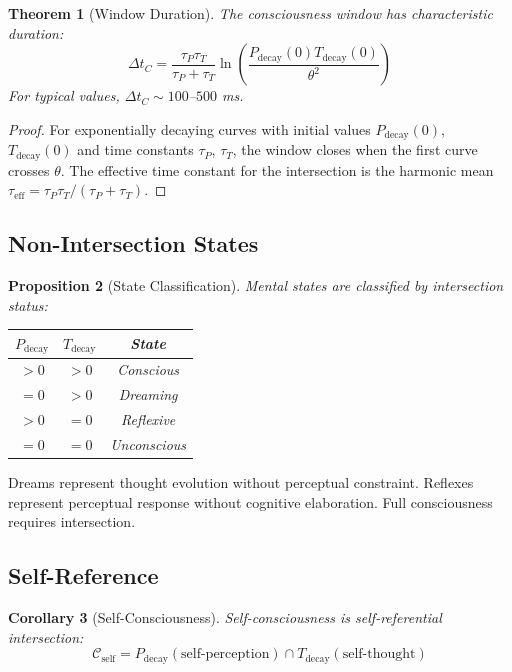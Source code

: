 \documentclass[twocolumn,amsmath,amssymb,aps,prl,superscriptaddress]{revtex4-2}
\newtheorem{theorem}{Theorem}[section]
\newtheorem{proposition}[theorem]{Proposition}
\newtheorem{corollary}[theorem]{Corollary}
\newcommand{\Ccat}{\mathcal{C}}
\newcommand{\Pdecay}{P_{\text{decay}}}
\newcommand{\Tdecay}{T_{\text{decay}}}
\begin{document}
\begin{theorem}[Window Duration]
\label{thm:window}
The consciousness window has characteristic duration:
\begin{equation}
\Delta t_C = \frac{\tau_P \tau_T}{\tau_P + \tau_T} \ln\left(\frac{\Pdecay(0) \Tdecay(0)}{\theta^2}\right)
\end{equation}
For typical values, $\Delta t_C \sim 100$--$500$ ms.
\end{theorem}

\begin{proof}
For exponentially decaying curves with initial values $\Pdecay(0)$, $\Tdecay(0)$ and time constants $\tau_P$, $\tau_T$, the window closes when the first curve crosses $\theta$. The effective time constant for the intersection is the harmonic mean $\tau_{\text{eff}} = \tau_P \tau_T / (\tau_P + \tau_T)$.
\end{proof}

\subsection{Non-Intersection States}

\begin{proposition}[State Classification]
Mental states are classified by intersection status:
\begin{center}
\begin{tabular}{ccc}
\toprule
$\Pdecay$ & $\Tdecay$ & State \\
\midrule
$> 0$ & $> 0$ & Conscious \\
$= 0$ & $> 0$ & Dreaming \\
$> 0$ & $= 0$ & Reflexive \\
$= 0$ & $= 0$ & Unconscious \\
\bottomrule
\end{tabular}
\end{center}
\end{proposition}

Dreams represent thought evolution without perceptual constraint. Reflexes represent perceptual response without cognitive elaboration. Full consciousness requires intersection.

\subsection{Self-Reference}

\begin{corollary}[Self-Consciousness]
Self-consciousness is self-referential intersection:
\begin{equation}
\Ccat_{\text{self}} = \Pdecay(\text{self-perception}) \cap \Tdecay(\text{self-thought})
\end{equation}
\end{corollary}
\end{document}
